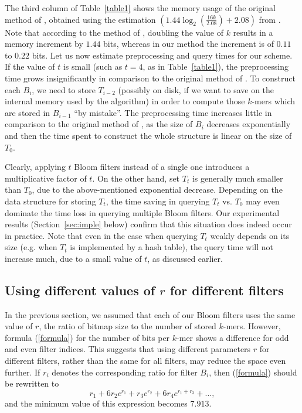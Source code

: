 \documentclass[pdftex]{llncs}\usepackage[T1]{fontenc}
\begin{document}
The third column of Table~\ref{table1} shows the memory usage of the original method of \cite{DBLP:conf/wabi/ChikhiR12}, obtained using the estimation 
$(1.44 \log_2 (\frac{16k}{2.08}) + 2.08)$ from \cite{DBLP:conf/wabi/ChikhiR12}. 
Note that according to the method of \cite{DBLP:conf/wabi/ChikhiR12},
doubling the value of $k$ results in a memory increment by $1.44$
bits, whereas in our method the increment is of $0.11$ to $0.22$
bits. 
\bigskip
Let us now estimate preprocessing and query times for our scheme. If the value of $t$ is small (such as $t=4$, as in  Table~\ref{table1}), the preprocessing time grows insignificantly in comparison to the original method of \cite{DBLP:conf/wabi/ChikhiR12}. To construct each $B_i$, we need to store $T_{i-2}$ (possibly on disk, if we want to save on the internal memory used by the algorithm) in order to compute those $k$-mers which are stored in $B_{i-1}$ ``by mistake''.
The preprocessing time increases little in comparison to the original method of \cite{DBLP:conf/wabi/ChikhiR12}, as the size of $B_i$ decreases exponentially and then the time spent to construct the whole structure is linear on the size of $T_0$.


Clearly, applying $t$ Bloom filters instead of a single one introduces
a multiplicative factor of $t$. On the other hand, set $T_t$
is generally much smaller than $T_0$, due to the above-mentioned
exponential decrease. Depending on the data structure for storing
$T_t$, the time saving in querying $T_t$ vs. $T_0$ may even dominate
the time loss in querying multiple Bloom filters. Our experimental
results (Section~\ref{sec:imple} below) confirm that this situation
does indeed occur in practice. Note that even in the case when
querying $T_t$ weakly depends on its size (e.g. when $T_t$ is
implemented by a hash table), the query time will not increase much,
due to a small value of $t$, as discussed earlier. 




\subsection{Using different values of $r$ for different filters} \label{subsec:difr}
In the previous section, we assumed that each of our Bloom filters
uses the same value of $r$, the ratio of bitmap size to the number of
stored $k$-mers. However, formula (\ref{formula}) 
for the number of bits per $k$-mer 
shows a difference for odd and even filter indices. This suggests
that using different parameters $r$ for different filters, rather than
the same for all filters, may reduce the space even further. 
If $r_i$ denotes the corresponding ratio for filter $B_i$, then
(\ref{formula}) should be rewritten to 
\begin{equation}
r_1 + 6r_2c^{r_1} + r_3c^{r_2} + 6r_4c^{r_1+r_3} + ...,
\end{equation}
and the minimum value of this expression becomes $7.913$.
\end{document}
